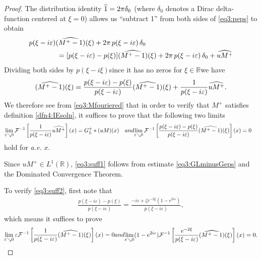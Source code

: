\documentclass[../dissertation.tex]{subfiles}
\begin{document}
\begin{proof}
	The distribution identity $\widehat{1} = 2\pi\delta_0$ (where $\delta_0$ denotes a 
	Dirac delta-function centered at $\xi=0$) allows us ``subtract 1'' from both
	sides of \eqref{eq3:peps} to obtain
	\begin{align*}
		&p(\xi -i \varepsilon)(\widehat{M^+-1})(\xi) + 2\pi \, p(\xi-i\varepsilon)\,\delta_0 \\
		&\qquad\qquad= [p(\xi-i\varepsilon) - p(\xi)]
						(\widehat{M^+-1})(\xi) 
						+ 2\pi\,p(\xi-i\varepsilon)\,\delta_0 + \widehat{uM^+}
	\end{align*}
	Dividing both sides by $p(\xi-i\xi)$\textemdash{}since it has no zeros 
	for $\xi\in \mathbb R$\textemdash{}we have
	\begin{align}\label{eq3:Mfouriered}
		(\widehat{M^+ -1})(\xi) 
			= \frac{p(\xi-i\varepsilon) - p(\xi)}{p(\xi - i\varepsilon)}(\widehat{M^+-1})(\xi)
				+ \frac{1}{p(\xi - i\varepsilon)} \widehat{uM^+}.
	\end{align}
	We therefore see from \eqref{eq3:Mfouriered} that in order to verify that $M^+$ satisfies
	definition \ref{dfn4:IEsoln}, it suf{}fices to prove that the following two limits
	\begin{subequations}
		\label{eq3:suff}
		\begin{align}
			\label{eq3:suff1}
			\lim_{\varepsilon \searrow 0} \mathcal F^{-1}
				 	\left[\frac{1}{p(\xi - i\varepsilon)} \wh{uM^+}\right](x)
				 &= G_L^+*(uM)(x)
		\end{align}
		and
		\begin{align}
			\label{eq3:suff2}
				\lim_{\varepsilon \searrow 0} \mathcal F^{-1}
						\left[ 
							\frac{p(\xi-i\varepsilon) - p(\xi)}{p(\xi-i\varepsilon)}
							(\wh{M^+-1})(\xi) 
						\right]
						(x)
					&= 0
		\end{align}
	\end{subequations}
	hold for \textit{a.e.} $x$.

	Since $uM^+ \in L^1(\mathbb R)$, \eqref{eq3:suff1} follows from estimate 
	\eqref{eq3:GLminusGeps} and the Dominated Convergence Theorem. 

	To verify \eqref{eq3:suff2}, first note that 
	\begin{align*}
		\frac{p(\xi - i\varepsilon) - p(\xi)}{p(\xi - i \varepsilon)}
			= \frac{-i \varepsilon + \zeta e^{-2\xi}\left(1-e^{2i\varepsilon}\right)}
					{p(\xi-i\varepsilon)},
	\end{align*}
	which means it suf{}fices to prove 
	\begin{subequations}
		\label{eq3:secondlims}
		\begin{align} \label{eq3:secondlims1}
			\lim_{\varepsilon \searrow 0} 
				\varepsilon \mathcal F^{-1}
					\left[ 
						\frac{1}{p(\xi-i\varepsilon)} (\wh{M^+-1})(\xi) 
					\right](x) 
			= 0
		\end{align}
		and
		\begin{align} \label{eq3:secondlims2}
			\lim_{\varepsilon \searrow 0} 
				(1-e^{2i\varepsilon}) \mathcal F^{-1}
					\left[ 
						\frac{e^{-2\xi}}{p(\xi-i\varepsilon)} (\wh{M^+-1})(\xi) 
					\right](x) 
			= 0.
		\end{align}
	\end{subequations}




\end{proof}
\end{document}

